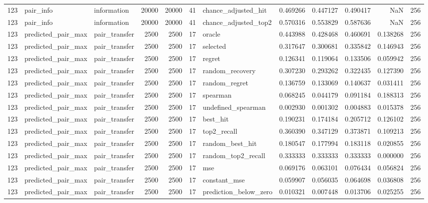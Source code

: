 \begin{tabular}{rllrrrlrrrrr}
123 & pair_info & information & 20000 & 20000 & 41 & chance_adjusted_hit & 0.469266 & 0.447127 & 0.490417 & NaN & 256 \\
123 & pair_info & information & 20000 & 20000 & 41 & chance_adjusted_top2 & 0.570316 & 0.553829 & 0.587636 & NaN & 256 \\
123 & predicted_pair_max & pair_transfer & 2500 & 2500 & 17 & oracle & 0.443988 & 0.428468 & 0.460691 & 0.138268 & 256 \\
123 & predicted_pair_max & pair_transfer & 2500 & 2500 & 17 & selected & 0.317647 & 0.300681 & 0.335842 & 0.146943 & 256 \\
123 & predicted_pair_max & pair_transfer & 2500 & 2500 & 17 & regret & 0.126341 & 0.119064 & 0.133506 & 0.059942 & 256 \\
123 & predicted_pair_max & pair_transfer & 2500 & 2500 & 17 & random_recovery & 0.307230 & 0.293262 & 0.322435 & 0.127390 & 256 \\
123 & predicted_pair_max & pair_transfer & 2500 & 2500 & 17 & random_regret & 0.136759 & 0.133069 & 0.140637 & 0.031411 & 256 \\
123 & predicted_pair_max & pair_transfer & 2500 & 2500 & 17 & spearman & 0.068245 & 0.044179 & 0.091184 & 0.188313 & 256 \\
123 & predicted_pair_max & pair_transfer & 2500 & 2500 & 17 & undefined_spearman & 0.002930 & 0.001302 & 0.004883 & 0.015378 & 256 \\
123 & predicted_pair_max & pair_transfer & 2500 & 2500 & 17 & best_hit & 0.190231 & 0.174184 & 0.205712 & 0.126102 & 256 \\
123 & predicted_pair_max & pair_transfer & 2500 & 2500 & 17 & top2_recall & 0.360390 & 0.347129 & 0.373871 & 0.109213 & 256 \\
123 & predicted_pair_max & pair_transfer & 2500 & 2500 & 17 & random_best_hit & 0.180547 & 0.177994 & 0.183118 & 0.020855 & 256 \\
123 & predicted_pair_max & pair_transfer & 2500 & 2500 & 17 & random_top2_recall & 0.333333 & 0.333333 & 0.333333 & 0.000000 & 256 \\
123 & predicted_pair_max & pair_transfer & 2500 & 2500 & 17 & mse & 0.069176 & 0.063101 & 0.076434 & 0.056824 & 256 \\
123 & predicted_pair_max & pair_transfer & 2500 & 2500 & 17 & constant_mse & 0.059907 & 0.056035 & 0.064698 & 0.036808 & 256 \\
123 & predicted_pair_max & pair_transfer & 2500 & 2500 & 17 & prediction_below_zero & 0.010321 & 0.007448 & 0.013706 & 0.025255 & 256 \\

\end{tabular}
